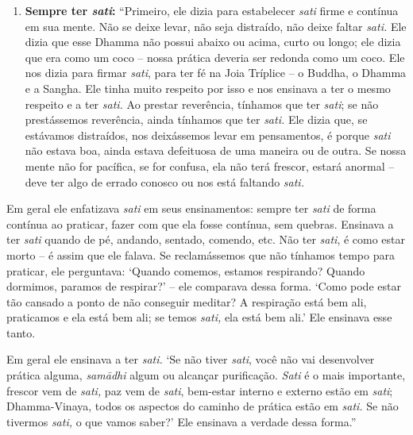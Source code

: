 \begin{enumerate}
\item
  \textbf{Sempre ter \emph{sati}:} ``Primeiro, ele dizia para
  estabelecer \emph{sati} firme e contínua em sua mente. Não se deixe
  levar, não seja distraído, não deixe faltar \emph{sati.} Ele dizia que
  esse Dhamma não possui abaixo ou acima, curto ou longo; ele dizia que
  era como um coco -- nossa prática deveria ser redonda como um coco.
  Ele nos dizia para firmar \emph{sati}, para ter fé na Joia Tríplice --
  o Buddha, o Dhamma e a Sangha. Ele tinha muito respeito por isso e nos
  ensinava a ter o mesmo respeito e a ter \emph{sati.} Ao prestar
  reverência, tínhamos que ter \emph{sati}; se não prestássemos
  reverência, ainda tínhamos que ter \emph{sati.} Ele dizia que, se
  estávamos distraídos, nos deixássemos levar em pensamentos, é porque
  \emph{sati} não estava boa, ainda estava defeituosa de uma maneira ou
  de outra. Se nossa mente não for pacífica, se for confusa, ela não
  terá frescor, estará anormal -- deve ter algo de errado conosco ou nos
  está faltando \emph{sati.}
\end{enumerate}

Em geral ele enfatizava \emph{sati} em seus ensinamentos: sempre ter
\emph{sati} de forma contínua ao praticar, fazer com que ela fosse
contínua, sem quebras. Ensinava a ter \emph{sati} quando de pé, andando,
sentado, comendo, etc. Não ter \emph{sati}, é como estar morto -- é
assim que ele falava. Se reclamássemos que não tínhamos tempo para
praticar, ele perguntava: `Quando comemos, estamos respirando? Quando
dormimos, paramos de respirar?' -- ele comparava dessa forma. `Como pode
estar tão cansado a ponto de não conseguir meditar? A respiração está
bem ali, praticamos e ela está bem ali; se temos \emph{sati,} ela está
bem ali.' Ele ensinava esse tanto.

Em geral ele ensinava a ter \emph{sati.} `Se não tiver \emph{sati}, você
não vai desenvolver prática alguma, \emph{samādhi} algum ou alcançar
purificação. \emph{Sati} é o mais importante, frescor vem de
\emph{sati,} paz vem de \emph{sati}, bem-estar interno e externo estão
em \emph{sati}; Dhamma-Vinaya, todos os aspectos do caminho de prática
estão em \emph{sati.} Se não tivermos \emph{sati,} o que vamos saber?'
Ele ensinava a verdade dessa forma.''

